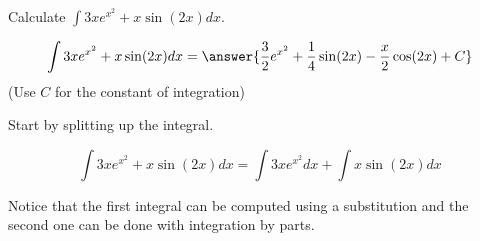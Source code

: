 \documentclass{ximera}
\author{Jim Talamo}
\begin{document}
\begin{exercise}
Calculate $\int 3xe^{x^2} +x \sin(2x) dx $.


\[
\int 3xe^{x^2} +x \sin(2x) dx = \answer{\frac{3}{2}e^{x^2}+\frac{1}{4}\sin(2x)-\frac{x}{2}\cos(2x)  + C } 
\]
(Use $C$ for the constant of integration)

\begin{hint}
Start by splitting up the integral.

\[
\int 3xe^{x^2} +x \sin(2x) dx = \int 3xe^{x^2} dx + \int x \sin(2x) dx
\]

Notice that the first integral can be computed using a substitution and the second one can be done with integration by parts.

\end{hint}

\end{exercise}
\end{document}
